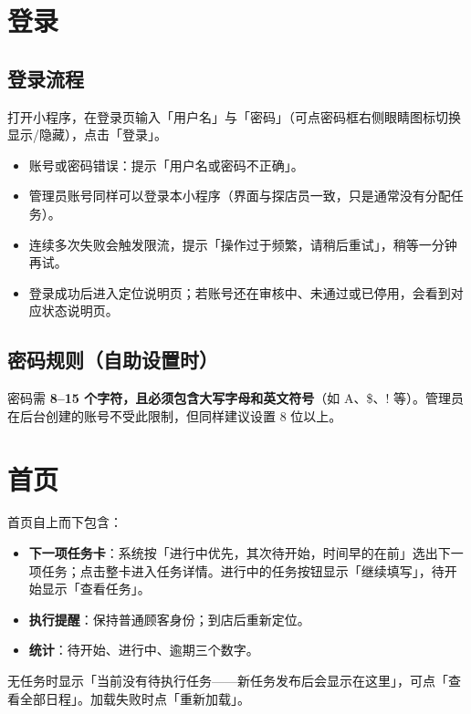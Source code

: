 \documentclass[12pt,a4paper,fontset=none]{ctexart}
\begin{document}
\section{登录}

\subsection{登录流程}
打开小程序，在登录页输入「用户名」与「密码」（可点密码框右侧眼睛图标切换显示/隐藏），点击「登录」。

\begin{itemize}
\item 账号或密码错误：提示「用户名或密码不正确」。
\item 管理员账号同样可以登录本小程序（界面与探店员一致，只是通常没有分配任务）。
\item 连续多次失败会触发限流，提示「操作过于频繁，请稍后重试」，稍等一分钟再试。
\item 登录成功后进入定位说明页；若账号还在审核中、未通过或已停用，会看到对应状态说明页。
\end{itemize}


\subsection{密码规则（自助设置时）}
密码需 \textbf{8–15 个字符，且必须包含大写字母和英文符号}（如 A、\$、! 等）。管理员在后台创建的账号不受此限制，但同样建议设置 8 位以上。

\section{首页}

首页自上而下包含：

\begin{itemize}
\item \textbf{下一项任务卡}：系统按「进行中优先，其次待开始，时间早的在前」选出下一项任务；点击整卡进入任务详情。进行中的任务按钮显示「继续填写」，待开始显示「查看任务」。
\item \textbf{执行提醒}：保持普通顾客身份；到店后重新定位。
\item \textbf{统计}：待开始、进行中、逾期三个数字。
\end{itemize}

无任务时显示「当前没有待执行任务——新任务发布后会显示在这里」，可点「查看全部日程」。加载失败时点「重新加载」。
\end{document}
